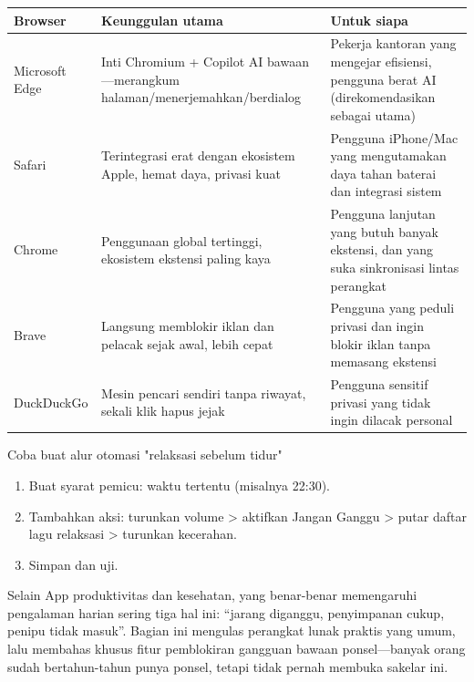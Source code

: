 
\begin{center}
\begin{tabularx}{\linewidth}{|X|X|X|}
\hline
\textbf{Browser} & \textbf{Keunggulan utama} & \textbf{Untuk siapa} \tabularnewline
\hline
Microsoft Edge & Inti Chromium + Copilot AI bawaan—merangkum halaman/menerjemahkan/berdialog & Pekerja kantoran yang mengejar efisiensi, pengguna berat AI (direkomendasikan sebagai utama) \tabularnewline
Safari & Terintegrasi erat dengan ekosistem Apple, hemat daya, privasi kuat & Pengguna iPhone/Mac yang mengutamakan daya tahan baterai dan integrasi sistem \tabularnewline
Chrome & Penggunaan global tertinggi, ekosistem ekstensi paling kaya & Pengguna lanjutan yang butuh banyak ekstensi, dan yang suka sinkronisasi lintas perangkat \tabularnewline
Brave & Langsung memblokir iklan dan pelacak sejak awal, lebih cepat & Pengguna yang peduli privasi dan ingin blokir iklan tanpa memasang ekstensi \tabularnewline
DuckDuckGo & Mesin pencari sendiri tanpa riwayat, sekali klik hapus jejak & Pengguna sensitif privasi yang tidak ingin dilacak personal \tabularnewline
\hline
\end{tabularx}
\end{center}

\begin{tcbpractice}{Coba buat alur otomasi "relaksasi sebelum tidur"}
\begin{enumerate}
  \item Buat syarat pemicu: waktu tertentu (misalnya 22:30).
  \item Tambahkan aksi: turunkan volume > aktifkan Jangan Ganggu > putar daftar lagu relaksasi > turunkan kecerahan.
  \item Simpan dan uji.
\end{enumerate}

\end{tcbpractice}


Selain App produktivitas dan kesehatan, yang benar-benar memengaruhi pengalaman harian sering tiga hal ini: “jarang diganggu, penyimpanan cukup, penipu tidak masuk”. Bagian ini mengulas perangkat lunak praktis yang umum, lalu membahas khusus fitur pemblokiran gangguan bawaan ponsel—banyak orang sudah bertahun-tahun punya ponsel, tetapi tidak pernah membuka sakelar ini.


